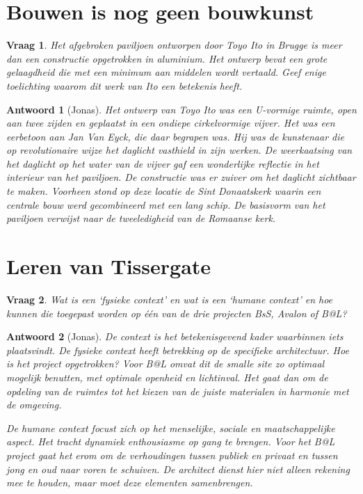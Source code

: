 \documentclass{article}
\theoremstyle{nonumberplain}
\newtheorem{question}{Vraag}
\newtheorem{answer}{Antwoord}
\begin{document}
\section{Bouwen is nog geen bouwkunst}

\begin{question}
Het afgebroken paviljoen ontworpen door Toyo Ito in Brugge is meer dan een
constructie opgetrokken in aluminium. Het ontwerp bevat een grote gelaagdheid
die met een minimum aan middelen wordt vertaald. Geef enige toelichting waarom
dit werk van Ito een betekenis heeft.
\end{question}

\begin{answer}[Jonas]

Het ontwerp van Toyo Ito was een U-vormige ruimte, open aan twee zijden en
geplaatst in een ondiepe cirkelvormige vijver. Het was een eerbetoon aan Jan Van
Eyck, die daar begrapen was. Hij was de kunstenaar die op revolutionaire wijze
het daglicht vasthield in zijn werken. De weerkaatsing van het daglicht op het
water van de vijver gaf een wonderlijke reflectie in het interieur van het
paviljoen. De constructie was er zuiver om het daglicht zichtbaar te maken.
Voorheen stond op deze locatie de Sint Donaatskerk waarin een centrale bouw werd
gecombineerd met een lang schip. De basisvorm van het paviljoen verwijst naar de
tweeledigheid van de Romaanse kerk.

\end{answer}

\section{Leren van Tissergate}

\begin{question}
Wat is een `fysieke context' en wat is een `humane context' en hoe kunnen
die toegepast worden op één van de drie projecten BsS, Avalon of B@L?
\end{question}

\begin{answer}[Jonas]

De \emph{context} is het betekenisgevend kader waarbinnen iets plaatsvindt. De
\emph{fysieke context} heeft betrekking op de specifieke architectuur. Hoe is
het project opgetrokken? Voor B@L omvat dit de smalle site zo optimaal mogelijk
benutten, met optimale openheid en lichtinval. Het gaat dan om de opdeling van
de ruimtes tot het kiezen van de juiste materialen in harmonie met de omgeving.

De \emph{humane context} focust zich op het menselijke, sociale en
maatschappelijke aspect. Het tracht dynamiek enthousiasme op gang te brengen.
Voor het B@L project gaat het erom om de verhoudingen tussen publiek en privaat
en tussen jong en oud naar voren te schuiven. De architect dienst hier niet
alleen rekening mee te houden, maar moet deze elementen samenbrengen.

\end{answer}
\end{document}
